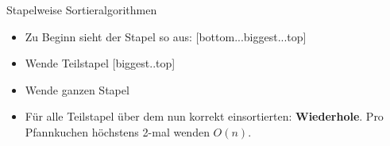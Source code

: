 \begin{frame}{Stapelweise Sortieralgorithmen}
	\solutionheading
	\begin{itemize}
	\item Zu Beginn sieht der Stapel so aus: [bottom...biggest...top]
	\item Wende Teilstapel [biggest..top] 
	\item Wende ganzen Stapel 
	\item Für alle Teilstapel über dem nun korrekt einsortierten: \textbf{Wiederhole}.
	\implitem Pro Pfannkuchen höchstens 2-mal wenden \impl $O(n)$.
	\end{itemize}
\end{frame}




